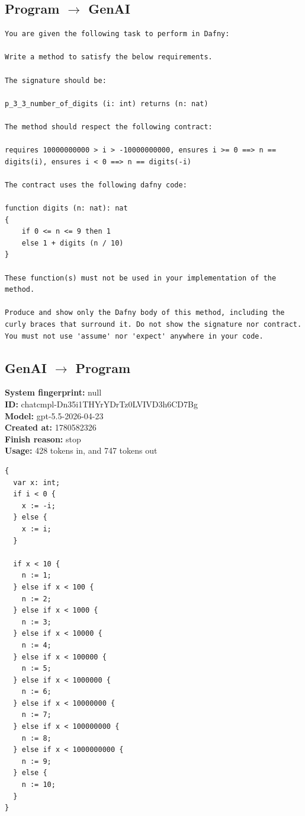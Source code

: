\documentclass{article}
\begin{document}
\subsection*{Program $\rightarrow$ GenAI}
\begin{lstlisting}
You are given the following task to perform in Dafny:

Write a method to satisfy the below requirements.

The signature should be:

p_3_3_number_of_digits (i: int) returns (n: nat)

The method should respect the following contract:

requires 10000000000 > i > -10000000000, ensures i >= 0 ==> n == digits(i), ensures i < 0 ==> n == digits(-i)

The contract uses the following dafny code:

function digits (n: nat): nat
{
    if 0 <= n <= 9 then 1
    else 1 + digits (n / 10)
}

These function(s) must not be used in your implementation of the method.

Produce and show only the Dafny body of this method, including the curly braces that surround it. Do not show the signature nor contract. You must not use 'assume' nor 'expect' anywhere in your code.
\end{lstlisting}
\subsection*{GenAI $\rightarrow$ Program}
\textbf{System fingerprint: }null
\\\textbf{ID: }chatcmpl-Dn35i1THYrYDrTz0LVIVD3h6CD7Bg
\\\textbf{Model: }gpt-5.5-2026-04-23
\\\textbf{Created at: }1780582326
\\\textbf{Finish reason: }stop
\\\textbf{Usage: }428 tokens in, and 747 tokens out
\begin{lstlisting}
{
  var x: int;
  if i < 0 {
    x := -i;
  } else {
    x := i;
  }

  if x < 10 {
    n := 1;
  } else if x < 100 {
    n := 2;
  } else if x < 1000 {
    n := 3;
  } else if x < 10000 {
    n := 4;
  } else if x < 100000 {
    n := 5;
  } else if x < 1000000 {
    n := 6;
  } else if x < 10000000 {
    n := 7;
  } else if x < 100000000 {
    n := 8;
  } else if x < 1000000000 {
    n := 9;
  } else {
    n := 10;
  }
}
\end{lstlisting}
\end{document}
